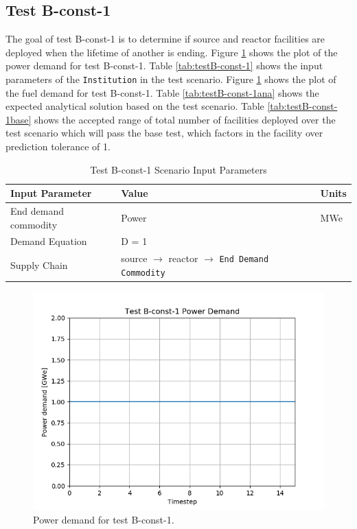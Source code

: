 \documentclass[11pt,letterpaper]{article}
\begin{document}
\subsection{Test B-const-1}
The goal of test B-const-1 is to determine if source and reactor facilities are deployed when the lifetime of another is ending. Figure \ref{fig:B-const-1} shows the plot of the power demand for test B-const-1. 
Table \ref{tab:testB-const-1} shows the input parameters of the \texttt{Institution} in the test scenario. Figure \ref{fig:B-const-1} shows the plot of the fuel demand for test B-const-1. 
Table \ref{tab:testB-const-1ana} shows the expected analytical solution based on the test scenario. Table \ref{tab:testB-const-1base} shows the accepted range of total number of facilities deployed over the test scenario which will pass the base test, which factors in the facility over prediction tolerance of 1. 

\begin{table}[H]
	\centering
	\caption{Test B-const-1 Scenario Input Parameters }
	\label{tab:test_B-const-1}
	\begin{tabular}{|l|l|l|}
		\hline
		\textbf{Input Parameter} & \textbf{Value} & \textbf{Units} \\
		\hline
		End demand commodity & Power & MWe \\
		Demand Equation & D = 1 & \\
		Supply Chain & source $\rightarrow$ reactor $\rightarrow$ \texttt{End Demand Commodity} &  \\
		\hline
	\end{tabular}
\end{table}

\begin{figure}[H]
	\begin{center}
		\includegraphics[scale=0.7]{./images/B-const-1.png}
	\end{center}
	\caption{Power demand for test B-const-1.}
	\label{fig:B-const-1}
\end{figure}
\end{document}
